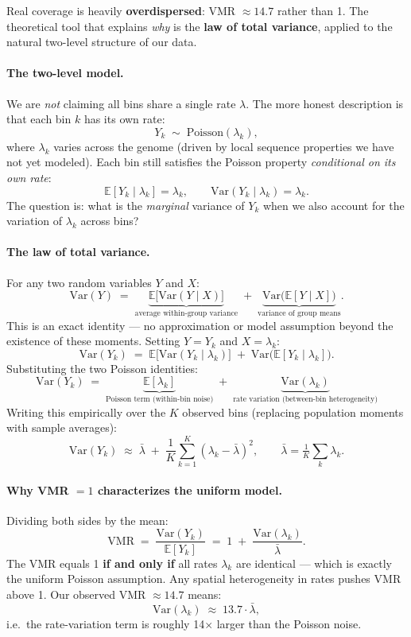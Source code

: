 \documentclass[11pt]{article}
\begin{document}
Real coverage is heavily \textbf{overdispersed}: VMR $\approx 14.7$ rather than 1.
The theoretical tool that explains \emph{why} is the \textbf{law of total variance},
applied to the natural two-level structure of our data.

\paragraph{The two-level model.}
We are \emph{not} claiming all bins share a single rate $\lambda$. The more honest
description is that each bin $k$ has its own rate:
\[
  Y_k \;\sim\; \text{Poisson}(\lambda_k),
\]
where $\lambda_k$ varies across the genome (driven by local sequence properties we
have not yet modeled). Each bin still satisfies the Poisson property
\emph{conditional on its own rate}:
\[
  \mathbb{E}[Y_k \mid \lambda_k] = \lambda_k, \qquad
  \mathrm{Var}(Y_k \mid \lambda_k) = \lambda_k.
\]
The question is: what is the \emph{marginal} variance of $Y_k$ when we also account
for the variation of $\lambda_k$ across bins?

\paragraph{The law of total variance.}
For any two random variables $Y$ and $X$:
\[
  \mathrm{Var}(Y) \;=\;
  \underbrace{\mathbb{E}\bigl[\mathrm{Var}(Y \mid X)\bigr]}_{\text{average within-group variance}}
  \;+\;
  \underbrace{\mathrm{Var}\bigl(\mathbb{E}[Y \mid X]\bigr)}_{\text{variance of group means}}.
\]
This is an exact identity --- no approximation or model assumption beyond the
existence of these moments. Setting $Y = Y_k$ and $X = \lambda_k$:
\[
  \mathrm{Var}(Y_k) \;=\;
  \mathbb{E}\bigl[\mathrm{Var}(Y_k \mid \lambda_k)\bigr]
  \;+\;
  \mathrm{Var}\bigl(\mathbb{E}[Y_k \mid \lambda_k]\bigr).
\]
Substituting the two Poisson identities:
\[
  \boxed{\mathrm{Var}(Y_k) \;=\;
  \underbrace{\mathbb{E}[\lambda_k]}_{\text{Poisson term (within-bin noise)}}
  \;+\;
  \underbrace{\mathrm{Var}(\lambda_k)}_{\text{rate variation (between-bin heterogeneity)}}}
\]
Writing this empirically over the $K$ observed bins (replacing population moments with
sample averages):
\[
  \mathrm{Var}(Y_k) \;\approx\;
  \bar\lambda \;+\; \frac{1}{K}\sum_{k=1}^K (\lambda_k - \bar\lambda)^2,
  \qquad \bar\lambda = \tfrac{1}{K}\textstyle\sum_k \lambda_k.
\]

\paragraph{Why VMR $= 1$ characterizes the uniform model.}
Dividing both sides by the mean:
\[
  \text{VMR} \;=\; \frac{\mathrm{Var}(Y_k)}{\mathbb{E}[Y_k]}
  \;=\; 1 \;+\; \frac{\mathrm{Var}(\lambda_k)}{\bar\lambda}.
\]
The VMR equals 1 \textbf{if and only if} all rates $\lambda_k$ are identical --- which
is exactly the uniform Poisson assumption. Any spatial heterogeneity in rates
pushes VMR above 1. Our observed VMR $\approx 14.7$ means:
\[
  \mathrm{Var}(\lambda_k) \;\approx\; 13.7 \cdot \bar\lambda,
\]
i.e.\ the rate-variation term is roughly 14$\times$ larger than the Poisson noise.
\end{document}
